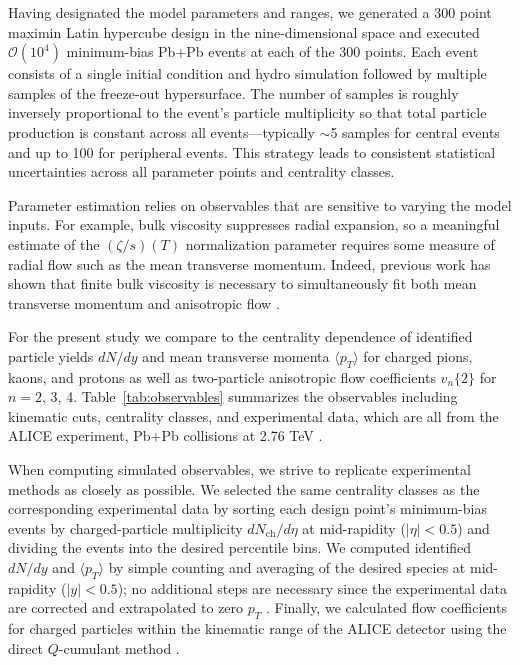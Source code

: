 \documentclass[aps,prc,reprint,amsmath,nofootinbib,superscriptaddress]{revtex4-1}
\newcommand{\avg}[1]{\langle #1 \rangle}
\newcommand{\nch}{N_\text{ch}}
\newcommand{\vnk}[2]{v_#1\{#2\}}
\newcommand{\order}[1]{$\mathcal O(10^{#1})$}
\begin{document}
Having designated the model parameters and ranges, we generated a 300 point maximin Latin hypercube design \cite{Morris:1995lh} in the nine-dimensional space and executed \order 4 minimum-bias Pb+Pb events at each of the 300 points.
Each event consists of a single initial condition and hydro simulation followed by multiple samples of the freeze-out hypersurface.
The number of samples is roughly inversely proportional to the event's particle multiplicity so that total particle production is constant across all events---typically ${\sim}$5 samples for central events and up to 100 for peripheral events.
This strategy leads to consistent statistical uncertainties across all parameter points and centrality classes.

Parameter estimation relies on observables that are sensitive to varying the model inputs.
For example, bulk viscosity suppresses radial expansion, so a meaningful estimate of the $(\zeta/s)(T)$ normalization parameter requires some measure of radial flow such as the mean transverse momentum.
Indeed, previous work has shown that finite bulk viscosity is necessary to simultaneously fit both mean transverse momentum and anisotropic flow \cite{Ryu:2015vwa}.

For the present study we compare to the centrality dependence of identified particle yields $dN/dy$ and mean transverse momenta $\avg{p_T}$ for charged pions, kaons, and protons as well as two-particle anisotropic flow coefficients $\vnk n 2$ for $n = 2$, 3, 4.
Table~\ref{tab:observables} summarizes the observables including kinematic cuts, centrality classes, and experimental data, which are all from the ALICE experiment, Pb+Pb collisions at 2.76 TeV \cite{Abelev:2013vea,ALICE:2011ab}.

When computing simulated observables, we strive to replicate experimental methods as closely as possible.
We selected the same centrality classes as the corresponding experimental data by sorting each design point's minimum-bias events by charged-particle multiplicity $d\nch/d\eta$ at mid-rapidity ($|\eta| < 0.5$) and dividing the events into the desired percentile bins.
We computed identified $dN/dy$ and $\avg{p_T}$ by simple counting and averaging of the desired species at mid-rapidity ($|y| < 0.5$); no additional steps are necessary since the experimental data are corrected and extrapolated to zero $p_T$ \cite{Abelev:2013vea}.
Finally, we calculated flow coefficients for charged particles within the kinematic range of the ALICE detector using the direct $Q$-cumulant method \cite{Bilandzic:2010jr}.
\end{document}
